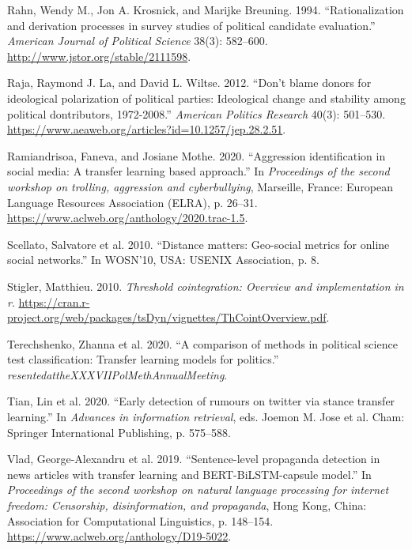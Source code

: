 \documentclass[12pt,]{article}
\begin{document}
\begin{CSLReferences}{1}{0}
\leavevmode{}%
Rahn, Wendy M., Jon A. Krosnick, and Marijke Breuning. 1994.
{``Rationalization and derivation processes in survey studies of
political candidate evaluation.''} \emph{American Journal of Political
Science} 38(3): 582--600. \url{http://www.jstor.org/stable/2111598}.

\leavevmode{}%
Raja, Raymond J. La, and David L. Wiltse. 2012. {``Don't blame donors
for ideological polarization of political parties: Ideological change
and stability among political dontributors, 1972-2008.''} \emph{American
Politics Research} 40(3): 501--530.
\url{https://www.aeaweb.org/articles?id=10.1257/jep.28.2.51}.

\leavevmode{}%
Ramiandrisoa, Faneva, and Josiane Mothe. 2020. {``Aggression
identification in social media: A transfer learning based approach.''}
In \emph{Proceedings of the second workshop on trolling, aggression and
cyberbullying}, Marseille, France: European Language Resources
Association (ELRA), p. 26--31.
\url{https://www.aclweb.org/anthology/2020.trac-1.5}.

\leavevmode{}%
Scellato, Salvatore et al. 2010. {``Distance matters: Geo-social metrics
for online social networks.''} In WOSN'10, USA: USENIX Association, p.
8.

\leavevmode{}%
Stigler, Matthieu. 2010. \emph{Threshold cointegration: Overview and
implementation in r}.
\url{https://cran.r-project.org/web/packages/tsDyn/vignettes/ThCointOverview.pdf}.

\leavevmode{}%
Terechshenko, Zhanna et al. 2020. {``A comparison of methods in
political science test classification: Transfer learning models for
politics.''} \emph{resentedattheXXXVIIPolMethAnnualMeeting}.

\leavevmode{}%
Tian, Lin et al. 2020. {``Early detection of rumours on twitter via
stance transfer learning.''} In \emph{Advances in information
retrieval}, eds. Joemon M. Jose et al. Cham: Springer International
Publishing, p. 575--588.

\leavevmode{}%
Vlad, George-Alexandru et al. 2019. {``Sentence-level propaganda
detection in news articles with transfer learning and
{BERT}-{B}i{LSTM}-capsule model.''} In \emph{Proceedings of the second
workshop on natural language processing for internet freedom:
Censorship, disinformation, and propaganda}, Hong Kong, China:
Association for Computational Linguistics, p. 148--154.
\url{https://www.aclweb.org/anthology/D19-5022}.


\end{CSLReferences}
\end{document}
